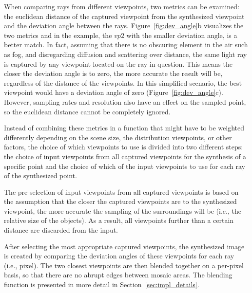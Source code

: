When comparing rays from different viewpoints, two metrics can be examined: the euclidean distance of the captured viewpoint from the synthesized viewpoint and the deviation angle between the rays. Figure~\ref{fig:dev_angle}b visualizes the two metrics and in the example, the $vp2$ with the smaller deviation angle, is a better match. In fact, assuming that there is no obscuring element in the air such as fog, and disregarding diffusion and scattering over distance, the same light ray is captured by any viewpoint located on the ray in question. This means the closer the deviation angle is to zero, the more accurate the result will be, regardless of the distance of the viewpoints. In this simplified scenario, the best viewpoint would have a deviation angle of zero (Figure~\ref{fig:dev_angle}c). However, sampling rates and resolution also have an effect on the sampled point, so the euclidean distance cannot be completely ignored.

Instead of combining these metrics in a function that might have to be weighted differently depending on the scene size, the distribution viewpoints, or other factors, the choice of which viewpoints to use is divided into two different steps: the choice of input viewpoints from all captured viewpoints for the synthesis of a specific point and the choice of which of the input viewpoints to use for each ray of the synthesized point. 

The pre-selection of input viewpoints from all captured viewpoints is based on the assumption that the closer the captured viewpoints are to the synthesized viewpoint, the more accurate the sampling of the surroundings will be (i.e., the relative size of the objects). As a result, all viewpoints further than a certain distance are discarded from the input. \label{misc:input_selection}

After selecting the most appropriate captured viewpoints, the synthesized image is created by comparing the deviation angles of these viewpoints for each ray (i.e., pixel). The two closest viewpoints are then blended together on a per-pixel basis, so that there are no abrupt edges between mosaic areas. The blending function is presented in more detail in Section~\ref{sec:impl_details}.


